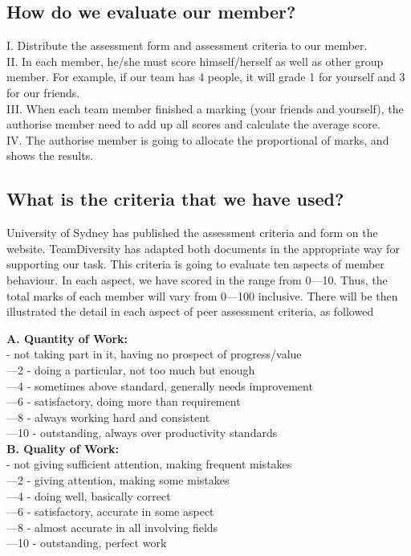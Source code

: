 \documentclass[11pt]{article}
\begin{document}
	\subsection{How do we evaluate our member?}
	
	\indent\indent I. Distribute the assessment form and assessment criteria to our member.\\
	\indent II. In each member, he/she must score himself/herself as well as other group member. For example, if our team has 4 people, it will grade 1 for yourself and 3 for our friends.\\
	\indent III. When each team member finished a marking (your friends and yourself), the authorise member need to add up all scores and calculate the average score.\\
	\indent IV. The authorise member is going to allocate the proportional of marks, and shows the results.     


	\subsection{What is the criteria that we have used?}
	\indent\indent\indent University of Sydney \cite{AssessmentCiteria} has published the assessment criteria and form on the website. TeamDiversity has adapted both documents in the appropriate way for supporting our task. This criteria is going to evaluate ten aspects of member behaviour. In each aspect, we have scored in the range from 0—10. Thus, the total marks of each member will vary from 0—100 inclusive. There will be then illustrated the detail in each aspect of peer assessment criteria, as followed \newline 

\textbf{A. Quantity of Work:}\\
	\indent{}	- not taking part in it, having no prospect of progress/value \\
	\indent{}—2	- doing a particular, not too much but enough\\
	\indent{}—4	- sometimes above standard, generally needs improvement \\
	\indent{}—6	- satisfactory, doing more than requirement \\
	\indent{}—8	- always working hard and consistent \\
	\indent{}—10	- outstanding, always over productivity standards \\

\textbf{B. Quality of Work:}\\
	\indent{}	- not giving sufficient attention, making frequent mistakes\\
	\indent{}—2	- giving attention, making some mistakes\\
	\indent{}—4	- doing well, basically correct\\
	\indent{}—6	- satisfactory, accurate in some aspect\\
	\indent{}—8	- almost accurate in all involving fields\\
	\indent{}—10	- outstanding, perfect work\\
\end{document}
